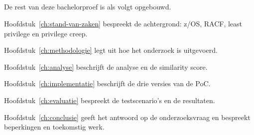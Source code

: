 \subsection*{}%
\label{sec:opzet-bachelorproef}

De rest van deze bachelorproef is als volgt opgebouwd.

Hoofdstuk~\ref{ch:stand-van-zaken} bespreekt de achtergrond: z/OS, RACF, least privilege en privilege creep.

Hoofdstuk~\ref{ch:methodologie} legt uit hoe het onderzoek is uitgevoerd.

Hoofdstuk~\ref{ch:analyse} beschrijft de analyse en de similarity score.

Hoofdstuk~\ref{ch:implementatie} beschrijft de drie versies van de PoC.

Hoofdstuk~\ref{ch:evaluatie} bespreekt de testscenario's en de resultaten.

Hoofdstuk~\ref{ch:conclusie} geeft het antwoord op de onderzoeksvraag en bespreekt beperkingen en toekomstig werk.
